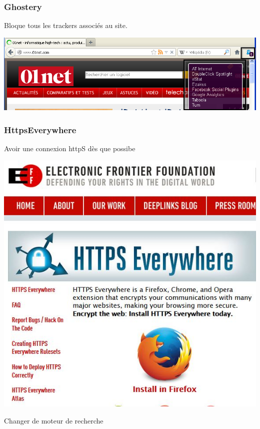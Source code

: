\documentclass{beamer}
\begin{document}
\begin{frame}
\frametitle{Ghostery}

Bloque tous les trackers associés au site.
\begin{center}
\includegraphics[scale=0.4] {./images/Ghostery_tracker.png}
\end{center}
\end{frame}

\begin{frame}
\frametitle{HttpsEverywhere}

Avoir une connexion httpS dès que possibe
\begin{center}
\includegraphics[scale=0.5] {./images/httpseverywhere.jpg}
\end{center}
\end{frame}
\begin{frame}
\begin{center}
\Huge{Changer de moteur de recherche}
\end{center}
\end{frame}
\end{document}
